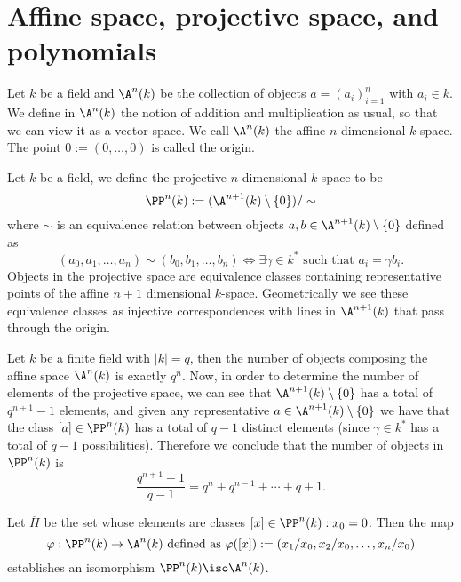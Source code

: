 \section{Affine space, projective space, and polynomials}

\begin{definition}
    Let \(k\) be a field and \(\A^n(k)\) be the collection of objects \(a =
    (a_i)_{i=1}^{n}\) with \(a_i \in k\). We define in \(\A^n(k)\) the notion of
    addition and multiplication as usual, so that we can view it as a vector
    space. We call \(\A^n(k)\) the affine \(n\) dimensional \(k\)-space. The
    point \(0 := (0, \dots, 0)\) is called the origin.
\end{definition}

\begin{definition}
    Let \(k\) be a field, we define the projective  \(n\) dimensional
    \(k\)-space to be
    \[
        \PP^n(k) := (\A^{n+1}(k)\setminus\{0\})/\sim
    \]
    where \(\sim\) is an equivalence relation between objects \(a, b \in
    \A^{n+1}(k) \setminus \{0\} \) defined as
    \[
        (a_0, a_1, \dots, a_n) \sim (b_0, b_1, \dots, b_n) \Leftrightarrow \exists
        \gamma \in k^\ast \text{ such that } a_i = \gamma b_i.
    \]
    Objects in the projective space are equivalence classes containing
    representative points of the affine \(n+1\) dimensional \(k\)-space.
    Geometrically we see these equivalence classes as injective correspondences
    with lines in \(\A^{n+1}(k)\) that pass through the origin.
\end{definition}

Let \(k\) be a finite field with  \(|k| = q \), then the number of objects
composing the affine space \(\A^n(k)\) is exactly  \(q^n\). Now, in order to
determine the number of elements of the projective space, we can see that
\(\A^{n+1}(k) \setminus \{0\} \) has a total of \(q^{n+1} - 1\) elements, and
given any representative \(a \in \A^{n+1}(k) \setminus \{0\} \) we have that the
class \([a] \in \PP^n(k)\) has a total of \(q-1\) distinct elements (since
\(\gamma \in k^\ast\) has a total of \(q-1\) possibilities). Therefore we
conclude that the number of objects in \(\PP^{n}(k)\) is
\[
    \frac{q^{n+1}-1}{q-1} = q^n + q^{n-1} + \cdots + q + 1.
\]

\begin{lemma}
    Let \(\overline{H}\) be the set whose elements are classes \([x] \in \PP^n(k)
    : x_0 = 0\). Then the map
    \[
        \varphi: \PP^{n}(k) \to \A^n(k) \text{ defined as } \varphi([x]) :=
        (x_1/x_0, x_2/x_0, \dots, x_n/x_0)
    \]
    establishes an isomorphism \(\PP^{n}(k) \iso \A^{n}(k)\).
\end{lemma}

